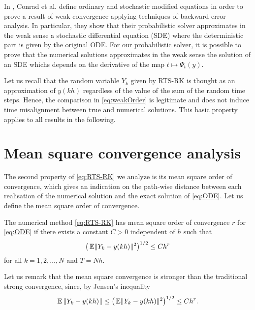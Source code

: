\documentclass[10pt]{article}
\begin{document}
\begin{remark}\label{rem:sde} In \cite{CGS17}, Conrad et al. define ordinary and stochastic modified equations in order to prove a result of weak convergence applying techniques of backward error analysis. In particular, they show that their probabilistic solver approximates in the weak sense a stochastic differential equation (SDE) where the deterministic part is given by the original ODE. For our probabilistic solver, it is possible to prove that the numerical solutions approximates in the weak sense the solution of an SDE whichs depends on the derivative of the map $t \mapsto \Psi_t(y)$. 
\end{remark}

\begin{remark} Let us recall that the random variable $Y_k$ given by RTS-RK is thought  as an approximation of $y(kh)$ regardless of the value of the sum of the random time steps. Hence, the comparison in \eqref{eq:weakOrder} is legitimate and does not induce time misalignment between true and numerical solutions. This basic property applies to all results in the following.
\end{remark}

\section{Mean square convergence analysis}\label{sec:StrongOrder}

The second property of \eqref{eq:RTS-RK} we analyze is its mean square order of convergence, which gives an indication on the path-wise distance between each realisation of the numerical solution and the exact solution of \eqref{eq:ODE}. Let us define the mean square order of convergence. 
\begin{definition} The numerical method \eqref{eq:RTS-RK} has mean square order of convergence $r$ for \eqref{eq:ODE} if there exists a constant $C > 0$ independent of $h$  such that
	\begin{equation}
	\big(\operatorname{\mathbb{E}}\lVert Y_k - y(kh)\rVert^2\big)^{1/2} \leq Ch^r
	\end{equation}
	for all $k = 1, 2, \ldots, N$ and $T = Nh$.
\end{definition} 
\begin{remark} Let us remark that the mean square convergence is stronger than the traditional strong convergence, since, by Jensen's inequality 
	\begin{equation}
		\operatorname{\mathbb{E}}{\lVert Y_k - y(kh)\rVert} \leq \big(\operatorname{\mathbb{E}}\lVert Y_k - y(kh)\rVert^2\big)^{1/2} \leq Ch^r.
	\end{equation}	
\end{remark}
\end{document}
